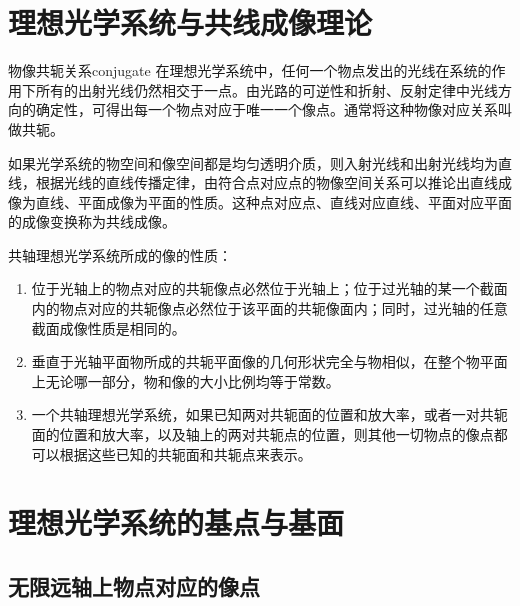 \documentclass[cn,11pt]{elegantbook}
\begin{document}
\section{理想光学系统与共线成像理论}

\begin{definition}{物像共轭关系}{conjugate}
	在理想光学系统中，任何一个物点发出的光线在系统的作用下所有的出射光线仍然相交于一点。由光路的可逆性和折射、反射定律中光线方向的确定性，可得出每一个物点对应于唯一一个像点。通常将这种物像对应关系叫做共轭。
\end{definition}

如果光学系统的物空间和像空间都是均匀透明介质，则入射光线和出射光线均为直线，根据光线的直线传播定律，由符合点对应点的物像空间关系可以推论出直线成像为直线、平面成像为平面的性质。这种点对应点、直线对应直线、平面对应平面的成像变换称为共线成像。

\begin{property}
共轴理想光学系统所成的像的性质：
\begin{enumerate}
	\item 位于光轴上的物点对应的共轭像点必然位于光轴上；位于过光轴的某一个截面内的物点对应的共轭像点必然位于该平面的共轭像面内；同时，过光轴的任意截面成像性质是相同的。
	\item 垂直于光轴平面物所成的共轭平面像的几何形状完全与物相似，在整个物平面上无论哪一部分，物和像的大小比例均等于常数。
	\item 一个共轴理想光学系统，如果已知两对共轭面的位置和放大率，或者一对共轭面的位置和放大率，以及轴上的两对共轭点的位置，则其他一切物点的像点都可以根据这些已知的共轭面和共轭点来表示。
\end{enumerate}
\end{property}

\section{理想光学系统的基点与基面}
\subsection{无限远轴上物点对应的像点}
\label{subsect:infty-object}
\end{document}
